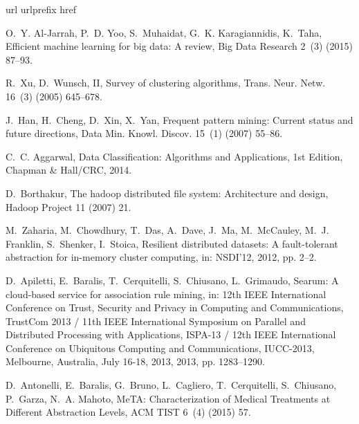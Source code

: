 \documentclass[preprint,review,12pt]{elsarticle}
\begin{document}
%
\begin{thebibliography}{10}
\expandafter\ifx\csname url\endcsname\relax
  \def\url#1{\texttt{#1}}\fi
\expandafter\ifx\csname urlprefix\endcsname\relax\def\urlprefix{URL }\fi
\expandafter\ifx\csname href\endcsname\relax
  \def\href#1#2{#2} \def\path#1{#1}\fi

O.~Y. Al{-}Jarrah, P.~D. Yoo, S.~Muhaidat, G.~K. Karagiannidis, K.~Taha,
  Efficient machine learning for big data: {A} review, Big Data Research 2~(3)
  (2015) 87--93.

R.~Xu, D.~Wunsch, II, Survey of clustering algorithms, Trans. Neur. Netw.
  16~(3) (2005) 645--678.

J.~Han, H.~Cheng, D.~Xin, X.~Yan, Frequent pattern mining: Current status and
  future directions, Data Min. Knowl. Discov. 15~(1) (2007) 55--86.

C.~C. Aggarwal, Data Classification: Algorithms and Applications, 1st Edition,
  Chapman \& Hall/CRC, 2014.

D.~Borthakur, The hadoop distributed file system: Architecture and design,
  Hadoop Project 11 (2007) 21.

M.~Zaharia, M.~Chowdhury, T.~Das, A.~Dave, J.~Ma, M.~McCauley, M.~J. Franklin,
  S.~Shenker, I.~Stoica, Resilient distributed datasets: A fault-tolerant
  abstraction for in-memory cluster computing, in: NSDI'12, 2012, pp. 2--2.

D.~Apiletti, E.~Baralis, T.~Cerquitelli, S.~Chiusano, L.~Grimaudo, Searum: {A}
  cloud-based service for association rule mining, in: 12th {IEEE}
  International Conference on Trust, Security and Privacy in Computing and
  Communications, TrustCom 2013 / 11th {IEEE} International Symposium on
  Parallel and Distributed Processing with Applications, {ISPA-13} / 12th
  {IEEE} International Conference on Ubiquitous Computing and Communications,
  IUCC-2013, Melbourne, Australia, July 16-18, 2013, 2013, pp. 1283--1290.

D.~Antonelli, E.~Baralis, G.~Bruno, L.~Cagliero, T.~Cerquitelli, S.~Chiusano,
  P.~Garza, N.~A. Mahoto, {MeTA: Characterization of Medical Treatments at
  Different Abstraction Levels}, {ACM} {TIST} 6~(4) (2015) 57.


\end{thebibliography}
\end{document}
